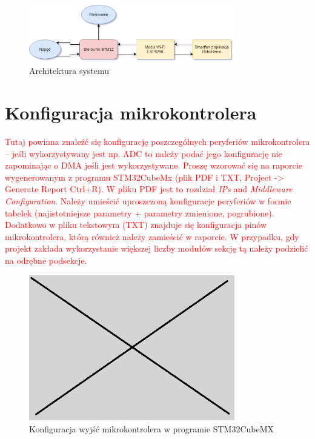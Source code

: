 \documentclass[10pt, a4paper]{article}
\begin{document}
\begin{figure}[H]
	\centering
	\includegraphics[width=0.8\textwidth]{figures/diagram.png}
	\caption{Architektura systemu}
	\label{fig:Architektura}
\end{figure}

\section{Konfiguracja mikrokontrolera}
\textcolor{red}{Tutaj powinna znaleźć się konfigurację poszczególnych peryferiów 
	mikrokontrolera -- jeśli wykorzystywany jest np. ADC to należy 
	podać jego konfigurację nie zapominając o DMA jeśli jest 
	wykorzystywane. Proszę wzorować się na raporcie wygenerowanym 
	z programu STM32CubeMx 
	(plik PDF i TXT, Project -> Generate Report Ctrl+R). 
	W pliku PDF jest to rozdział \textit{IPs} and \textit{Middleware Configuration}. 
	Należy umieścić uproszczoną konfiguracje peryferiów w formie 
	tabelek (najistotniejsze parametry + parametry zmienione, pogrubione).
	Dodatkowo w pliku tekstowym (TXT) znajduje się konfiguracja pinów 
	mikrokontrolera, którą również należy zamieścić w raporcie.
W przypadku, gdy projekt zakłada wykorzystanie większej liczby modułów
sekcję tą należy podzielić na odrębne podsekcje.}

\begin{figure}[H]
	\centering
	\includegraphics[width=0.8\textwidth]{figures/obraz.png}
	\caption{Konfiguracja wyjść mikrokontrolera w programie STM32CubeMX}
	\label{fig:KonfiguracjaMikrokontrolera}
\end{figure}
\end{document}
